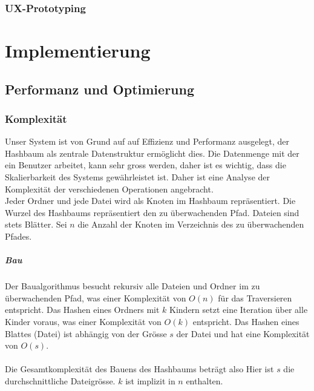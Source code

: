 \documentclass[a4paper,12pt]{report}
\begin{document}
    \newpage

    \subsection{UX-Prototyping}


    \chapter{Implementierung}


    \section{Performanz und Optimierung}

    \subsection{Komplexität}

    Unser System ist von Grund auf auf Effizienz und Performanz ausgelegt, der Hashbaum als zentrale Datenstruktur ermöglicht dies.
    Die Datenmenge mit der ein Benutzer arbeitet, kann sehr gross werden, daher ist es wichtig, dass die Skalierbarkeit des Systems gewährleistet ist.
    Daher ist eine Analyse der Komplexität der verschiedenen Operationen angebracht.
    \\
    Jeder Ordner und jede Datei wird als Knoten im Hashbaum repräsentiert.
    Die Wurzel des Hashbaums repräsentiert den zu überwachenden Pfad.
    Dateien sind stets Blätter.\newline
    Sei $n$ die Anzahl der Knoten im Verzeichnis des zu überwachenden Pfades.

    \paragraph{Bau}
    Der Baualgorithmus besucht rekursiv alle Dateien und Ordner im zu überwachenden Pfad,
    was einer Komplexität von $O(n)$ für das Traversieren entspricht.
    Das Hashen eines Ordners mit $k$ Kindern setzt eine Iteration über alle Kinder voraus, was einer Komplexität von $O(k)$ entspricht.
    Das Hashen eines Blattes (Datei) ist abhängig von der Grösse $s$ der Datei und hat eine Komplexität von $O(s)$.
    \\\\
    Die Gesamtkomplexität des Bauens des Hashbaums beträgt also 
    Hier ist $s$ die durchschnittliche Dateigrösse. $k$ ist implizit in $n$ enthalten.
\end{document}
